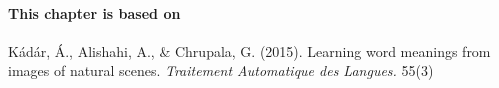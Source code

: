 \paragraph{This chapter is based on} Kádár, Á., Alishahi, A., \& Chrupala, G. (2015). 
Learning word meanings from images of natural scenes. \textit{Traitement Automatique des Langues.} 55(3)

\newpage





%










%
%

%



%

